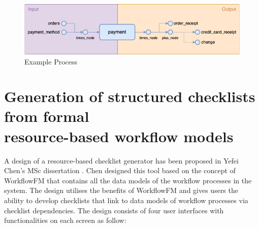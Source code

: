 \begin{figure}[ht!]
    \centering
    \includegraphics[width=\textwidth]{overleaf/images/process_flows.png}
    \caption{Example Process}
    \label{fig:process_flows}
\end{figure}

\section{Generation of structured checklists from formal \\resource-based workflow models}
\label{background:chens_design}

A design of a resource-based checklist generator has been proposed in Yefei Chen's MSc dissertation \cite{checklistdesign}. Chen designed this tool based on the concept of WorkflowFM that contains all the data models of the workflow processes in the system. The design utilises the benefits of WorkflowFM and gives users the ability to develop checklists that link to data models of workflow processes via checklist dependencies.
The design consists of four user interfaces with functionalities on each screen as follow:

